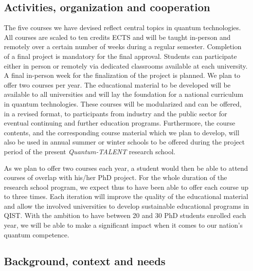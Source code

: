 \documentclass{scrreprt}
\begin{document}
\subsection{Activities, organization and cooperation}

The five courses we have devised reflect central topics in quantum
technologies. All courses are scaled to ten credits ECTS and will be
taught in-person and remotely over a certain number of weeks during a
regular semester. Completion of a final project is mandatory
for the final approval.  Students can participate either in person or
remotely via dedicated classrooms available at each university.  A
final in-person week for the finalization of the project is planned.
We plan to offer two courses per year. The educational material to
be developed will be available to all universities and will lay the
foundation for a national curriculum in quantum technologies. These
courses will be modularized and can be offered, in a revised format,
to participants from industry and the public sector for eventual
continuing and further education programs.
Furthermore, the course contents, and the corresponding course material which we plan to develop, will also be used in annual summer or winter schools to be offered during the project period of the present \textit{Quantum-TALENT} research school.

As we plan to offer two courses each year, a student would then be able to attend courses of overlap with his/her PhD project.  For the whole duration of the research school program, we expect thus to have been able to offer each course up to three times.  Each iteration will improve the quality of the educational material and allow the involved universities to develop sustainable educational programs in QIST. With the ambition to have between 20 and 30 PhD students enrolled each year, we will be able to make a significant impact when it comes to our nation's quantum competence.

\subsection{Background, context and needs}
\end{document}
